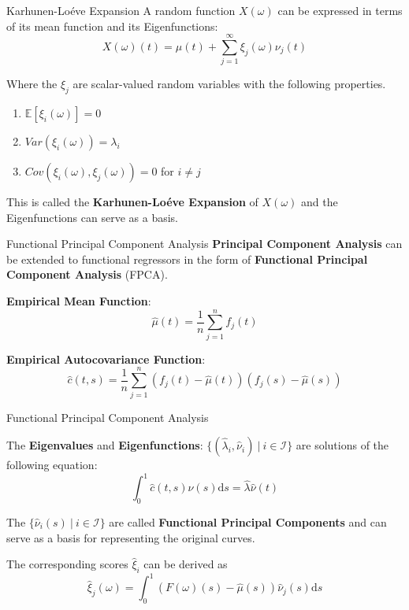 \documentclass{beamer}
\begin{document}
	\begin{frame}{Karhunen-Lo\'{e}ve Expansion}
		A random function $X(\omega)$ can be expressed in terms of its mean function and its Eigenfunctions:
		$$X(\omega)(t) = \mu(t) + \sum_{j = 1}^{\infty} \xi_j(\omega) \nu_j(t)$$
		
		Where the $\xi_j$ are scalar-valued random variables with the following properties.
		\begin{multicols}{2}
			\begin{enumerate}
				\item $\mathbb{E}[\xi_i(\omega)] = 0$
				\item $Var(\xi_i(\omega)) = \lambda_i$
				\item $Cov(\xi_i(\omega), \xi_j(\omega)) = 0$ for $i \neq j$
			\end{enumerate}
		\end{multicols}
		
		This is called the \textbf{Karhunen-Lo\'{e}ve Expansion} of $X(\omega)$ and the Eigenfunctions can serve as a basis.
	\end{frame}

	\begin{frame}{Functional Principal Component Analysis}
		\textbf{Principal Component Analysis} can be extended to functional regressors in the form of \textbf{Functional Principal Component Analysis} (FPCA).
		\vspace{0.4cm}
		
		\textbf{Empirical Mean Function}:
		$$\hat{\mu}(t) = \frac{1}{n}\sum_{j = 1}^{n}f_j(t)$$

		\textbf{Empirical Autocovariance Function}:
		$$\hat{c}(t,s) = \frac{1}{n} \sum_{j = 1}^{n} \left(f_j(t) - \hat{\mu}(t)\right) \left(f_j(s) - \hat{\mu}(s)\right)$$

	\end{frame}

	\begin{frame}{Functional Principal Component Analysis}
	
		The \textbf{Eigenvalues} and \textbf{Eigenfunctions}: $\{(\hat{\lambda}_i, \hat{\nu}_i) \: \vert \: i \in \mathcal{I}\}$  are solutions of the following equation:
		$$ \int_{0}^{1}\hat{c}(t,s)\hat{\nu}(s) \mathrm{d}s = \hat{\lambda} \hat{\nu}(t) $$
		\vspace{0.2cm}
		
		The $\{\hat{\nu}_i(s) \: \vert \: i \in \mathcal{I}\}$ are called \textbf{Functional Principal Components} and can serve as a basis for representing the original curves. 
		\vspace{0.2cm}
		
		The corresponding scores $\hat{\xi}_i$ can be derived as
		$$\hat{\xi}_j(\omega) = \int_{0}^{1} (F(\omega)(s) - \hat{\mu}(s)) \hat{\nu}_j(s) \mathrm{d}s$$
		
	\end{frame}
\end{document}
